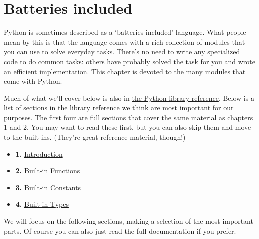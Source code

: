 \documentclass[12pt]{book}
\begin{document}
\chapter{Batteries included}

Python is sometimes described as a `batteries-included' language. What people mean by this is that the language comes with a rich collection of modules that you can use to solve everyday tasks. There's no need to write any specialized code to do common tasks: others have probably solved the task for you and wrote an efficient
implementation. This chapter is devoted to the many modules that come with Python.

Much of what we'll cover below is also in \href{https://docs.python.org/3.5/library/index.html}{the Python library reference}. Below is a list of sections in the library reference we think are most important
for our purposes. The first four are full sections that cover the same material as chapters 1 and 2.
You may want to read these first, but you can also skip them and move to the built-ins.
(They're great reference material, though!)

\begin{itemize}
\item \textbf{1.} \href{https://docs.python.org/3.5/library/intro.html}{Introduction}
\item \textbf{2.} \href{https://docs.python.org/3.5/library/functions.html}{Built-in Functions}
\item \textbf{3.} \href{https://docs.python.org/3.5/library/constants.html}{Built-in Constants}
\item \textbf{4.} \href{https://docs.python.org/3.5/library/stdtypes.html}{Built-in Types}
\end{itemize}

We will focus on the following sections, making a selection of the most important parts. Of course you can also just read the full documentation if you prefer.
\end{document}
